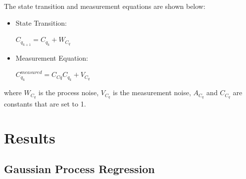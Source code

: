 The state transition and measurement equations are shown below:
\begin{itemize}
\item State Transition: 
	\begin{center}
	$C_{q_{k+1}} = C_{q_{k}} + W_{C_{q}}$
	\end{center}
\item Measurement Equation: 
\begin{center}
 $C_{q_k}^{measured} = C_{C{q}}C_{q_{k}} + V_{C_{q}}$
\end{center}
\end{itemize}

where $W_{C_q}$ is the process noise, $V_{C_q}$ is the measurement noise, $A_{C_q}$ and $C_{C_q}$ are constants that are set to 1.

\section{Results}
\subsection{Gaussian Process Regression}

